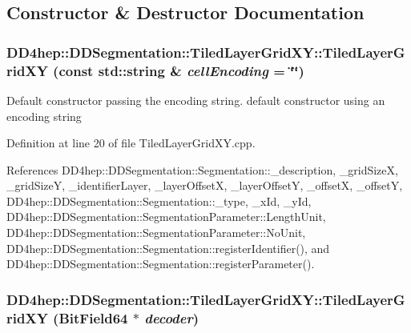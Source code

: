 \subsection{Constructor \& Destructor Documentation}
\hypertarget{class_d_d4hep_1_1_d_d_segmentation_1_1_tiled_layer_grid_x_y_acbf674bb93ded0eedfa0d57426af8400}{
\subsubsection[{TiledLayerGridXY}]{\setlength{\rightskip}{0pt plus 5cm}DD4hep::DDSegmentation::TiledLayerGridXY::TiledLayerGridXY (const std::string \& {\em cellEncoding} = {\ttfamily \char`\"{}\char`\"{}})}}
\label{class_d_d4hep_1_1_d_d_segmentation_1_1_tiled_layer_grid_x_y_acbf674bb93ded0eedfa0d57426af8400}


Default constructor passing the encoding string. default constructor using an encoding string 

Definition at line 20 of file TiledLayerGridXY.cpp.

References DD4hep::DDSegmentation::Segmentation::\_\-description, \_\-gridSizeX, \_\-gridSizeY, \_\-identifierLayer, \_\-layerOffsetX, \_\-layerOffsetY, \_\-offsetX, \_\-offsetY, DD4hep::DDSegmentation::Segmentation::\_\-type, \_\-xId, \_\-yId, DD4hep::DDSegmentation::SegmentationParameter::LengthUnit, DD4hep::DDSegmentation::SegmentationParameter::NoUnit, DD4hep::DDSegmentation::Segmentation::registerIdentifier(), and DD4hep::DDSegmentation::Segmentation::registerParameter().\hypertarget{class_d_d4hep_1_1_d_d_segmentation_1_1_tiled_layer_grid_x_y_a4ff90dbb3f490c1258513bfb3c26e215}{
\subsubsection[{TiledLayerGridXY}]{\setlength{\rightskip}{0pt plus 5cm}DD4hep::DDSegmentation::TiledLayerGridXY::TiledLayerGridXY ({\bf BitField64} $\ast$ {\em decoder})}}
\label{class_d_d4hep_1_1_d_d_segmentation_1_1_tiled_layer_grid_x_y_a4ff90dbb3f490c1258513bfb3c26e215}


